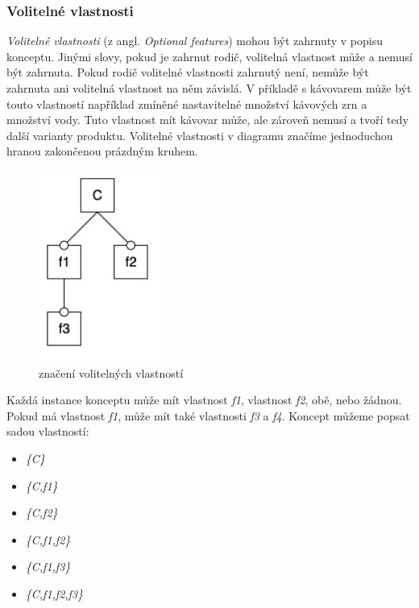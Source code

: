 \subsubsection{Volitelné vlastnosti}
\textit{Volitelné vlastnosti} (z angl. \textit{Optional features}) mohou být zahrnuty v popisu konceptu. Jinými slovy, pokud je zahrnut rodič, volitelná vlastnost může a nemusí být zahrnuta. Pokud rodič volitelné vlastnosti zahrnutý není, nemůže být zahrnuta ani volitelná vlastnost na něm závislá. V příkladě s kávovarem může být touto vlastností například zmíněné nastavitelné množství kávových zrn a množství vody. Tuto vlastnost mít kávovar může, ale zároveň nemusí a tvoří tedy další varianty produktu.
Volitelné vlastnosti v diagramu značíme jednoduchou hranou zakončenou prázdným kruhem.
\begin{figure}[H]
	\centering
	\includegraphics[width=4cm]{images/optional}
	\caption{značení volitelných vlastností}
\end{figure}
Každá instance konceptu může mít vlastnost \textit{f1}, vlastnost \textit{f2}, obě, nebo žádnou. Pokud má vlastnost \textit{f1}, může mít také vlastnosti \textit{f3} a \textit{f4}. Koncept můžeme popsat sadou vlastností: 
\begin{itemize}
	\item \textit{\{C\}}
	\item \textit{\{C,f1\}}
	\item \textit{\{C,f2\}}
	\item \textit{\{C,f1,f2\}}
	\item \textit{\{C,f1,f3\}}
	\item \textit{\{C,f1,f2,f3\}}
\end{itemize}


